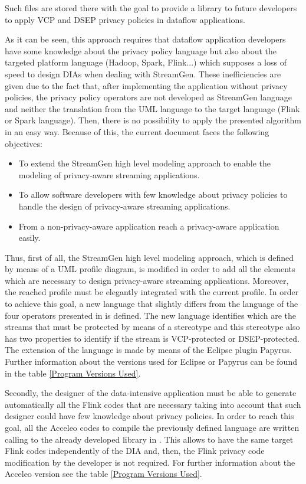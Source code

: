 Such files are stored there with the goal to provide a library to future developers to apply VCP and DSEP privacy policies in dataflow applications.

As it can be seen, this approach requires that dataflow application developers have some knowledge about the privacy policy language but also about the targeted platform language (Hadoop, Spark, Flink...) which supposes a loss of speed to design DIAs when dealing with StreamGen. These inefficiencies are given due to the fact that, after implementing the application without privacy policies, the privacy policy operators are not developed as StreamGen language and neither the translation from the UML language to the target language (Flink or Spark language). Then, there is no possibility to apply the presented algorithm in an easy way. Because of this, the current document faces the following objectives:

\begin{itemize}
\item To extend the StreamGen high level modeling approach to enable the modeling of privacy-aware streaming applications.
\item To allow software developers with few knowledge about privacy policies to handle the design of privacy-aware streaming applications.
\item From a non-privacy-aware application reach a privacy-aware application easily.
\end{itemize}

Thus, first of all, the StreamGen high level modeling approach, which is defined by means of a UML profile diagram, is modified in order to add all the elements which are necessary to design privacy-aware streaming applications. Moreover, the reached profile must be elegantly integrated with the current profile. In order to achieve this goal, a new language that slightly differs from the language of the four operators presented in \cite{privacypoliciesarticle} is defined. The new language identifies which are the streams that must be protected by means of a stereotype and this stereotype also has two properties to identify if the stream is VCP-protected or DSEP-protected. The extension of the language is made by means of the Eclipse plugin Papyrus. Further information about the versions used for Eclipse or Papyrus can be found in the table \ref{Program Versions Used}.

Secondly, the designer of the data-intensive application must be able to generate automatically all the Flink codes that are necessary taking into account that such designer could have few knowledge about privacy policies. In order to reach this goal, all the Acceleo codes to compile the previously defined language are written calling to the already developed library in \cite{privacypoliciesarticle}. This allows to have the same target Flink codes independently of the DIA and, then, the Flink privacy code modification by the developer is not required. For further information about the Acceleo version see the table \ref{Program Versions Used}.

